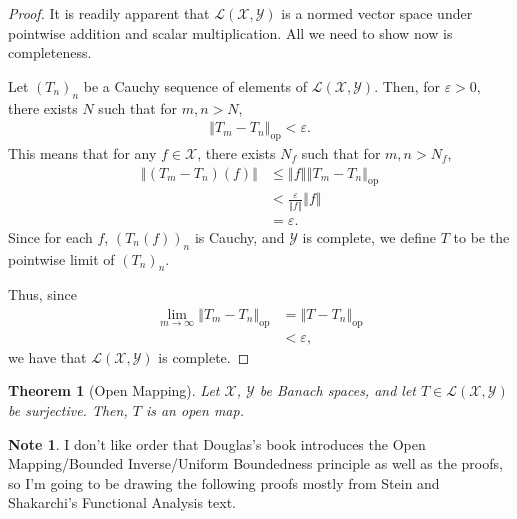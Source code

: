 \documentclass[10pt]{extarticle}
\newcommand{\norm}[1]{\left\Vert #1\right\Vert}
\newcommand{\ve}{\varepsilon}
\theoremstyle{plain}
\newtheorem*{theorem}{Theorem}
\theoremstyle{definition}
\theoremstyle{note}
\newtheorem*{note}{Note}
\renewcommand{\newline}{\hfill\break}
\begin{document}
\begin{proof}
  It is readily apparent that $\mathcal{L}\left(\mathcal{X},\mathcal{Y}\right)$ is a normed vector space under pointwise addition and scalar multiplication. All we need to show now is completeness. \newline

  Let $\left(T_n\right)_n$ be a Cauchy sequence of elements of $\mathcal{L}\left(\mathcal{X},\mathcal{Y}\right)$. Then, for $\ve > 0$, there exists $N$ such that for $m,n > N$,
  \begin{align*}
    \norm{T_m - T_n}_{\text{op}} < \ve.
  \end{align*}
  This means that for any $f\in \mathcal{X}$, there exists $N_f$ such that for $m,n > N_f$,
  \begin{align*}
    \norm{\left(T_m - T_n\right)(f)} &\leq \norm{f}\norm{T_m-T_n}_{\text{op}}\\
                                     &< \frac{\ve}{\norm{f}} \norm{f}\\
                                     &= \ve.
  \end{align*}
  Since for each $f$, $\left(T_n(f)\right)_n$ is Cauchy, and $\mathcal{Y}$ is complete, we define $T$ to be the pointwise limit of $\left(T_n\right)_n$.\newline

  Thus, since
  \begin{align*}
    \lim_{m\rightarrow\infty}\norm{T_m - T_n}_{\text{op}} &= \norm{T - T_n}_{\text{op}}\\
                                                          &< \ve,
  \end{align*}
  we have that $\mathcal{L}\left(\mathcal{X},\mathcal{Y}\right)$ is complete.
\end{proof}
\begin{theorem}[Open Mapping]
  Let $\mathcal{X}$, $\mathcal{Y}$ be Banach spaces, and let $T\in \mathcal{L}\left(\mathcal{X},\mathcal{Y}\right)$ be surjective. Then, $T$ is an open map.
\end{theorem}
\begin{note}
  I don't like order that Douglas's book introduces the Open Mapping/Bounded Inverse/Uniform Boundedness principle as well as the proofs, so I'm going to be drawing the following proofs mostly from Stein and Shakarchi's Functional Analysis text.
\end{note}
\end{document}
